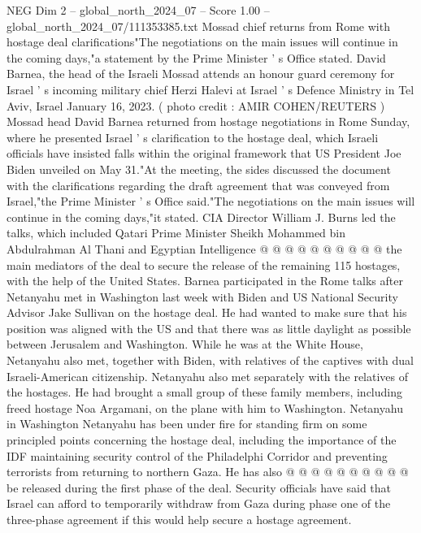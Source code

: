 \begin{textsample}{NEG Dim 2 – global\_north\_2024\_07 – Score 1.00 – global\_north\_2024\_07/111353385.txt}  \label{ex:f2_neg_062}
Mossad chief returns from Rome with hostage deal clarifications"The negotiations on the main issues will continue in the coming days,"a statement by the Prime Minister ' s Office stated.
David Barnea, the head of the Israeli Mossad attends an honour guard ceremony for Israel ' s incoming military chief Herzi Halevi at Israel ' s Defence Ministry in Tel Aviv, Israel January 16, 2023. ( photo credit : AMIR COHEN/REUTERS ) Mossad head David Barnea returned from hostage negotiations in Rome Sunday, where he presented Israel ' s clarification to the hostage deal, which Israeli officials have insisted falls within the original framework that US President Joe Biden unveiled on May 31."At the meeting, the sides discussed the document with the clarifications regarding the draft agreement that was conveyed from Israel,"the Prime Minister ' s Office said."The negotiations on the main issues will continue in the coming days,"it stated.
CIA Director William J.
Burns led the talks, which included Qatari Prime Minister Sheikh Mohammed bin Abdulrahman Al Thani and Egyptian Intelligence @ @ @ @ @ @ @ @ @ @ the main mediators of the deal to secure the release of the remaining 115 hostages, with the help of the United States.
Barnea participated in the Rome talks after Netanyahu met in Washington last week with Biden and US National Security Advisor Jake Sullivan on the hostage deal.
He had wanted to make sure that his position was aligned with the US and that there was as little daylight as possible between Jerusalem and Washington.
While he was at the White House, Netanyahu also met, together with Biden, with relatives of the captives with dual Israeli-American citizenship.
Netanyahu also met separately with the relatives of the hostages.
He had brought a small group of these family members, including freed hostage Noa Argamani, on the plane with him to Washington.
Netanyahu in Washington Netanyahu has been under fire for standing firm on some principled points concerning the hostage deal, including the importance of the IDF maintaining security control of the Philadelphi Corridor and preventing terrorists from returning to northern Gaza.
He has also @ @ @ @ @ @ @ @ @ @ be released during the first phase of the deal.
Security officials have said that Israel can afford to temporarily withdraw from Gaza during phase one of the three-phase agreement if this would help secure a hostage agreement.

\end{textsample}
